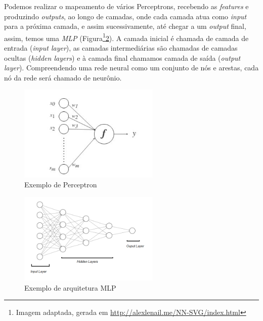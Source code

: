Podemos realizar o mapeamento de vários Perceptrons, recebendo as \textit{features} e produzindo \textit{outputs}, ao longo de camadas, onde cada camada atua como \textit{input} para a próxima camada, e assim sucessivamente, até chegar a
 um \textit{output} final, assim, temos uma \textit{MLP} (Figura\footnote{Imagem adaptada, gerada em \url{http://alexlenail.me/NN-SVG/index.html}}\ref{fig:mlp}).
 A camada inicial é chamada de camada de entrada (\textit{input layer}), as camadas intermediárias são chamadas de camadas ocultas (\textit{hidden layers}) e à camada final chamamos camada de saída (\textit{output layer}). Compreendendo uma rede neural como um conjunto de nós e arestas, cada nó da rede será chamado de neurônio.

\begin{figure}[!ht]
\centering
\includegraphics[width=0.6\textwidth]{img/perceptron.png}
\caption{\label{fig:perceptron}Exemplo de Perceptron}

\author{Fonte: Retirado de~\cite{12}}
\end{figure}

\begin{figure}[!h]
\centering
\includegraphics[width=0.6\textwidth]{img/mlp02.png}
\caption{\label{fig:mlp}Exemplo de arquitetura \acrshort{MLP}}

\end{figure}

